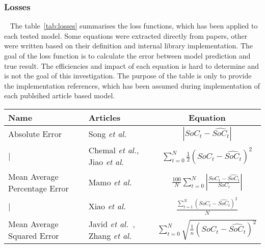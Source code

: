 \subsubsection{Losses}~\label{subsub:losses}
The table~\ref{tab:losses} summarises the loss functions, which has been applied to each tested model.
Some equations were extracted directly from papers, other were written based on their definition and internal library implementation.
The goal of the loss function is to calculate the error between model prediction and true result.
The efficiencies and impact of each equation is hard to determine and is not the goal of this investigation.
The purpose of the table is only to provide the implementation references, which has been assumed during implementation of each publsihed article based model.
    \begin{tabular}{ l l c }
        \hline
        Name & Articles & Equation \\ 
        \hline
        Absolute Error & Song \textit{et al.}~\cite{song_lithium-ion_2018} & $|SoC_t-\hat{SoC_t}|$ \\
        \hline
        | & Chemal \textit{et al.}\cite{Chemali2017}, Jiao \textit{et al.}~\cite{jiao_gru-rnn_2020} & $\sum\limits^N_{t=0} \frac{1}{2} (SoC_t-\hat{SoC_t})^2$ \\
        \hline
        Mean Average Percentage Error & Mamo \textit{et al.}~\cite{mamo_long_2020} & $\frac{100}{N}\sum\limits^N_{t=0}|\frac{SoC_t-\hat{SoC_t}}{SoC_t}|$ \\
        \hline
        | & Xiao \textit{et al.}~\cite{xiao_accurate_2019} & $\frac{\sum\limits^N_{t=1}(SoC_t-\hat{SoC_t})^2}{N}$ \\
        \hline
        Mean Average Squared Error & Javid \textit{et al.}~\cite{javid_adaptive_2020}, Zhang \textit{et al.}~\cite{zhang_deep_2020} & $\sum\limits^N_{t=0} \sqrt{\frac{1}{n} (SoC_t-\hat{SoC_t})^2}$ \\
        \hline
    \end{tabular}
